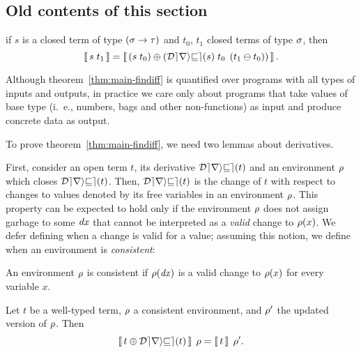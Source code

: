 \begin{oldSec}

\subsection{Old contents of this section}

\begin{theorem}
\label{thm:main-findiff}
if $s$ is a closed term of type $\Fun*\Gs\Gt$ and $t_0$, $t_1$
closed terms of type $\sigma$, then
\[
\Eval{\App s{t_1}}
=
\Eval{\Apply
{\App*{\App{\Derive s}{t_0}}{\Diff*{t_1}{t_0}}}
{\App* s{t_0}}}.
\]
\end{theorem}

Although theorem~\ref{thm:main-findiff} is quantified over
programs with all types of inputs and outputs, in practice we
care only about programs that take values of base type (i.\ e.,
numbers, bags and other non-functions) as input
and produce concrete data as output.

To prove theorem~\ref{thm:main-findiff}, we need two lemmas about derivatives.

First, consider an open term $t$, its derivative
$\Derive{t}$ and an environment $\rho$ which closes $\Derive{t}$.
Then, $\Derive{t}$ is the change of $t$ with respect to changes
to values denoted by its free variables in an environment $\rho$.
This property can be expected to hold
%
only if the environment $\rho$ does not assign garbage to some $\mathit{dx}$ that cannot be interpreted as a \emph{valid} change to
$\rho(x)$. We defer defining when a change is valid for a
value; assuming this notion, we define when an environment
is \emph{consistent}:
%

\begin{definition}
\label{def:consistency}
An environment $\rho$ is consistent if $\rho(\mathit{dx})$ is a valid
change to $\rho(x)$ for every variable $x$.
\end{definition}

\begin{lemma}
\label{lem:freevars}
Let $t$ be a well-typed term, $\rho$ a consistent environment, and
$\rho'$ the updated version of $\rho$. Then
\[
\EvalWith{ \Apply{\Derive t}{t} } \Gr = \EvalWith{t}{\Gr'}.
\]
\end{lemma}


\end{oldSec}
